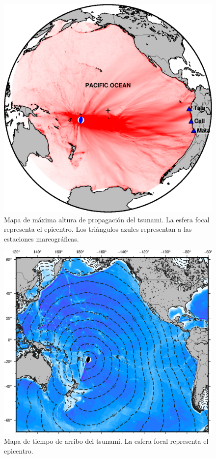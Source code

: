 \documentclass[a4paper,11pt,twoside]{article}
\begin{document}
\begin{figure}
	\centerline{\includegraphics[scale=0.82]{maxola.eps}}
	\caption{Mapa de máxima altura de propagación del tsunami. La esfera focal representa el epicentro. Los triángulos azules representan a las estaciones mareográficas.}
	\label{mareograma}
\end{figure}

\begin{figure}
	\centerline{\includegraphics[scale=0.78]{ttt.eps}}
	\caption{Mapa de tiempo de arribo del tsunami. La esfera focal representa el 
		epicentro.}
	\label{ttt}
\end{figure}
\end{document}

